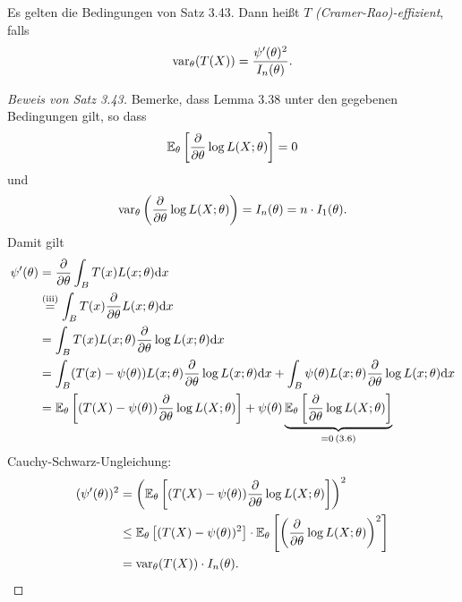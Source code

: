 \begin{defn} %
  Es gelten die Bedingungen von Satz 3.43. Dann heißt $T$
  \emph{(Cramer-Rao)-effizient}, falls
  \[ \operatorname{var}_\theta(T(X)) = \frac{\psi'(\theta)^2}{I_n(\theta)}. \]
\end{defn}

\begin{proof}[Beweis von Satz 3.43]
  Bemerke, dass Lemma 3.38 unter den gegebenen Bedingungen gilt, so dass
  \begin{equation} %
    \pE_\theta \left[ \pdiff{}{\theta} \log L(X;\theta) \right] = 0
  \end{equation}
  und
  \begin{equation} %
    \var_\theta \left( \pdiff{}{\theta} \log L(X;\theta) \right)
    = I_n(\theta) = n \cdot I_1(\theta).
  \end{equation}
  Damit gilt
  \begin{align*}
    \psi'(\theta)
    &= \frac{\partial }{\partial \theta} \int_B T(x) L(x;\theta) \mathrm{d} x \\
    &\overset{(\text{iii})}{=} \int_B T(x)
      \frac{\partial }{\partial \theta} L(x;\theta) \mathrm{d} x \\
    &= \int_B T(x) L(x;\theta) \frac{\partial }{\partial \theta} \log L(x;\theta) \mathrm{d} x \\
    &= \int_B (T(x) - \psi(\theta)) L(x;\theta)
      \frac{\partial }{\partial \theta} \log L(x;\theta) \mathrm{d} x
      + \int_B \psi(\theta) L(x;\theta)
      \frac{\partial }{\partial \theta} \log L(x;\theta) \mathrm{d} x \\
    &= \mathbb{E}_\theta \left[
      (T(X) - \psi(\theta)) \frac{\partial }{\partial \theta} \log L(X;\theta)
      \right]
      + \psi(\theta) \underbrace{\mathbb{E}_\theta \left[ 
      \frac{\partial }{\partial \theta} \log L(X;\theta) 
      \right]}_{=0\, (3.6)}
  \end{align*}
  Cauchy-Schwarz-Ungleichung:
  \begin{align*}
    (\psi'(\theta))^2
    &= \left( \mathbb{E}_\theta \left[
      (T(X)-\psi(\theta)) \frac{\partial }{\partial \theta} \log L(X;\theta)
      \right] \right)^2 \\
    &\le \mathbb{E}_\theta \left[
      (T(X)-\psi(\theta))^2
      \right] \cdot \mathbb{E}_\theta \left[ \left(
      \frac{\partial }{\partial \theta} \log L(X;\theta)
      \right)^2 \right] \\
    &= \operatorname{var}_\theta(T(X)) \cdot I_n(\theta). \qedhere
  \end{align*}
\end{proof}